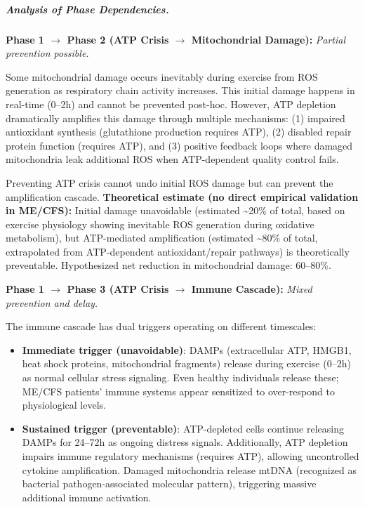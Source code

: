 \subparagraph{Analysis of Phase Dependencies.}

\textbf{Phase 1 $\rightarrow$ Phase 2 (ATP Crisis $\rightarrow$ Mitochondrial Damage):} \textit{Partial prevention possible.}

Some mitochondrial damage occurs inevitably during exercise from ROS generation as respiratory chain activity increases. This initial damage happens in real-time (0--2h) and cannot be prevented post-hoc. However, ATP depletion dramatically amplifies this damage through multiple mechanisms: (1) impaired antioxidant synthesis (glutathione production requires ATP), (2) disabled repair protein function (requires ATP), and (3) positive feedback loops where damaged mitochondria leak additional ROS when ATP-dependent quality control fails.

Preventing ATP crisis cannot undo initial ROS damage but can prevent the amplification cascade. \textbf{Theoretical estimate (no direct empirical validation in ME/CFS):} Initial damage unavoidable (estimated \textasciitilde20\% of total, based on exercise physiology showing inevitable ROS generation during oxidative metabolism), but ATP-mediated amplification (estimated \textasciitilde80\% of total, extrapolated from ATP-dependent antioxidant/repair pathways) is theoretically preventable. Hypothesized net reduction in mitochondrial damage: 60--80\%.

\textbf{Phase 1 $\rightarrow$ Phase 3 (ATP Crisis $\rightarrow$ Immune Cascade):} \textit{Mixed prevention and delay.}

The immune cascade has dual triggers operating on different timescales:

\begin{itemize}
    \item \textbf{Immediate trigger (unavoidable)}: DAMPs (extracellular ATP, HMGB1, heat shock proteins, mitochondrial fragments) release during exercise (0--2h) as normal cellular stress signaling. Even healthy individuals release these; ME/CFS patients' immune systems appear sensitized to over-respond to physiological levels.

    \item \textbf{Sustained trigger (preventable)}: ATP-depleted cells continue releasing DAMPs for 24--72h as ongoing distress signals. Additionally, ATP depletion impairs immune regulatory mechanisms (requires ATP), allowing uncontrolled cytokine amplification. Damaged mitochondria release mtDNA (recognized as bacterial pathogen-associated molecular pattern), triggering massive additional immune activation.
\end{itemize}

